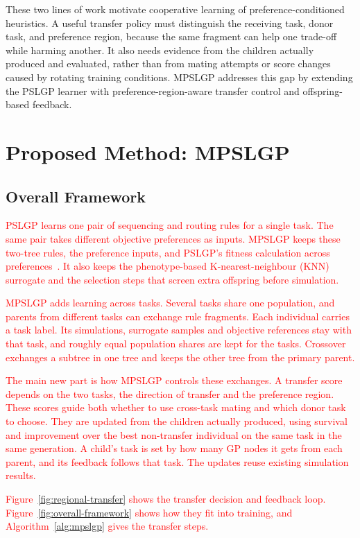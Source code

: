 \documentclass[10pt,journal]{IEEEtran}
\newcommand{\ablationrevision}[1]{\textcolor{red}{#1}}
\begin{document}
These two lines of work motivate cooperative learning of preference-conditioned heuristics. A useful transfer policy must distinguish the receiving task, donor task, and preference region, because the same fragment can help one trade-off while harming another. It also needs evidence from the children actually produced and evaluated, rather than from mating attempts or score changes caused by rotating training conditions. MPSLGP addresses this gap by extending the PSLGP learner with preference-region-aware transfer control and offspring-based feedback.

\section{Proposed Method: MPSLGP}
\label{sec:method}
\subsection{Overall Framework}
\ablationrevision{PSLGP learns one pair of sequencing and routing rules for a single task. The same pair takes different objective preferences as inputs. MPSLGP keeps these two-tree rules, the preference inputs, and PSLGP's fitness calculation across preferences~\cite{xu2026pslgp}. It also keeps the phenotype-based K-nearest-neighbour (KNN) surrogate and the selection steps that screen extra offspring before simulation.}

\ablationrevision{MPSLGP adds learning across tasks. Several tasks share one population, and parents from different tasks can exchange rule fragments. Each individual carries a task label. Its simulations, surrogate samples and objective references stay with that task, and roughly equal population shares are kept for the tasks. Crossover exchanges a subtree in one tree and keeps the other tree from the primary parent.}

\ablationrevision{The main new part is how MPSLGP controls these exchanges. A transfer score depends on the two tasks, the direction of transfer and the preference region. These scores guide both whether to use cross-task mating and which donor task to choose. They are updated from the children actually produced, using survival and improvement over the best non-transfer individual on the same task in the same generation. A child's task is set by how many GP nodes it gets from each parent, and its feedback follows that task. The updates reuse existing simulation results.}

\ablationrevision{Figure~\ref{fig:regional-transfer} shows the transfer decision and feedback loop. Figure~\ref{fig:overall-framework} shows how they fit into training, and Algorithm~\ref{alg:mpslgp} gives the transfer steps.}
\end{document}
